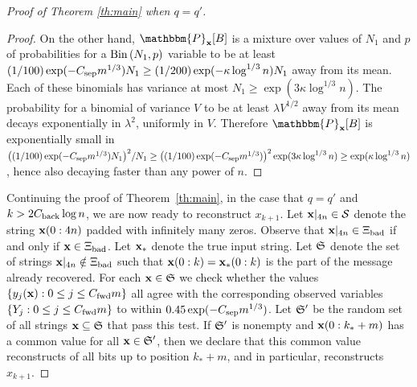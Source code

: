 \documentclass[final,12pt]{colt2018} %
\renewcommand{\P}{\mathbbm{P}}
\newcommand{\1}{\mathbf{1}}
\def\cS{\mathcal{S}}
\def\cSS{\frak{S}}
\def\cS{\mathcal{S}}
\def\x{{\bf x}}
\def\csep{C_{\rm sep}} %
\def\cfwd{C_{\rm fwd}} %
\def\cback{C_{\rm back}}
\def\bad{{\Xi_{\rm bad}}}
\def\Bin{{\rm Bin}\,}
\begin{document}
\begin{proof}[Proof of Theorem \ref{th:main} when $q = q'$]
\begin{proof}
		On the other hand, $\P_{\x} [B]$ is a mixture over values
		of $N_1$ and $p$ of probabilities for a $\Bin (N_1 , p)$
		variable to be at least $(1/100) \exp (- \csep m^{1/3})N_1 \geq
		(1/200) \exp (- \kappa \log^{1/3} n)N_1$
		away from its mean.  Each of these binomials has variance at most $N_1\geq \exp(3\kappa\log^{1/3}n)$.
		The probability for a binomial
		of variance $V$ to be at least $\lambda V^{1/2}$ away from its mean
		decays exponentially in $\lambda^2$, uniformly in $V$.  Therefore
		$\P_{\x} [B]$ is exponentially small in
		$\big((1/100)\exp(-\csep m^{1/3}) N_1 \big)^2/N_1
		\geq
		\big((1/100)\exp(-\csep m^{1/3}) \big)^2 \exp(3\kappa\log^{1/3}n) \geq \exp (\kappa \log^{1/3} n)$,
		hence also decaying faster than any power of $n$.
	\end{proof}
	
	Continuing the proof of Theorem~\ref{th:main}, in the case that $q = q'$
	and $k > 2\cback \log n$, we are now ready to reconstruct $x_{k+1}$.  Let $\x|_{4n}\in\cS$
	denote the string $\x(0:4n)$ padded with infinitely many zeros.
	Observe that $\x|_{4n} \in \bad$ if and only if $\x \in \bad$.
	Let $\x_*$ denote the true input string.  Let $\cSS$ denote the set
	of strings $\x|_{4n} \notin \bad$ such that $\x(0:k) = \x_* (0:k)$
	is the part of the message already recovered.
	For each $\x \in \cSS$ we check whether the values $\{ y_j (\x) :
	0 \leq j \leq \cfwd m \}$ all agree with the corresponding observed
	variables $\{ Y_j : 0 \leq j \leq \cfwd m \}$ to within $0.45 \exp (-
	\csep m^{1/3})$.  Let $\cSS'$ be the random set of all strings
	$\x \subseteq \cSS$ that pass this test.  If $\cSS'$ is nonempty and
	$\x (0 : k_* + m)$ has a common value for all $\x \in \cSS'$,
	then we declare that this common value reconstructs of all bits
	up to position $k_* + m$, and in particular, reconstructs $x_{k+1}$.
	

\end{proof}
\end{document}
